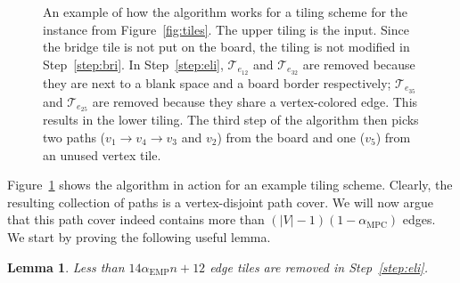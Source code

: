 \documentclass[11pt]{article}
\newtheorem{lemma}{Lemma}
\def\MPC{\mathrm{MPC}}
\def\EMP{\mathrm{EMP}}
\begin{document}
\begin{figure}
	\centering
	\begin{subfigure}[c]{\textwidth}
		\centering
		\scalebox{0.8}{}
	\end{subfigure}
	\vspace{8pt}

	\centering
	\begin{subfigure}[c]{\textwidth}
		\centering
		\scalebox{0.8}{}
	\end{subfigure}
	\vspace{4pt}

	\centering
	\begin{subfigure}[c]{\textwidth}
		\centering
		
	\end{subfigure}

	\caption{An example of how the algorithm works for a tiling scheme for the instance from Figure~\ref{fig:tiles}. The upper tiling is the input. Since the bridge tile is not put on the board, the tiling is not modified in Step~\ref{step:bri}. In Step~\ref{step:eli}, $\mathcal{T}_{e_{12}}$ and $\mathcal{T}_{e_{32}}$ are removed because they are next to a blank space and a board border respectively; $\mathcal{T}_{e_{35}}$ and $\mathcal{T}_{e_{25}}$ are removed because they share a vertex-colored edge. This results in the lower tiling. The third step of the algorithm then picks two paths ($v_1 \rightarrow v_4 \rightarrow v_3$ and $v_2$) from the board and one ($v_5$) from an unused vertex tile.}
	\label{fig:tiling-algo}
\end{figure}

Figure~\ref{fig:tiling-algo} shows the algorithm in action for an example tiling scheme. Clearly, the resulting collection of paths is a vertex-disjoint path cover. We will now argue that this path cover indeed contains more than $(|V| - 1)(1 - \alpha_{\MPC})$ edges. We start by proving the following useful lemma.

\begin{lemma} \label{lem:cleared-edge-tile}
Less than $14\alpha_{\EMP}n + 12$ edge tiles are removed in Step~\ref{step:eli}.
\end{lemma}
\end{document}
